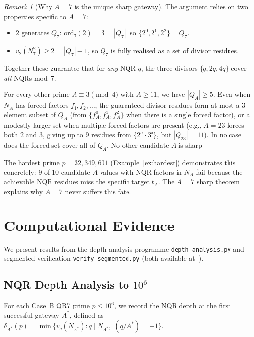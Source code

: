 \documentclass[12pt]{amsart}
\theoremstyle{definition}
\theoremstyle{remark}
\newtheorem{remark}[theorem]{Remark}
\begin{document}
\begin{remark}[Why $A = 7$ is the unique sharp gateway]\label{rem:a7unique}
The argument relies on two properties specific to $A = 7$:
\begin{itemize}
  \item $2$ generates $Q_7$: $\mathrm{ord}_7(2) = 3 = |Q_7|$,
    so $\{2^0, 2^1, 2^2\} = Q_7$.
  \item $v_2(N_7^2) \ge 2 = |Q_7| - 1$, so
    $Q_7$ is fully realised as a set of divisor residues.
\end{itemize}
Together these guarantee that for \emph{any} NQR $q$,
the three divisors $\{q, 2q, 4q\}$ cover \emph{all} NQRs mod~7.

For every other prime $A \equiv 3 \pmod 4$ with $A \ge 11$,
we have $|Q_A| \ge 5$.
Even when $N_A$ has forced factors $f_1, f_2, \ldots$,
the guaranteed divisor residues form at most a 3-element subset of $Q_A$
(from $\{f_A^0, f_A^1, f_A^2\}$ when there is a single forced factor),
or a modestly larger set when multiple forced factors are present
(e.g., $A = 23$ forces both $2$ and $3$, giving up to 9 residues from
$\{2^a \cdot 3^b\}$, but $|Q_{23}| = 11$).
In no case does the forced set cover all of $Q_A$.
No other candidate $A$ is sharp.

The hardest prime $p = 32{,}349{,}601$ (Example~\ref{ex:hardest})
demonstrates this concretely: 9 of 10 candidate $A$ values with
NQR factors in $N_A$ fail because the achievable NQR residues
miss the specific target $t_A$.
The $A = 7$ sharp theorem explains why $A = 7$ never suffers this fate.
\end{remark}

\section{Computational Evidence}\label{sec:computation}

We present results from the depth analysis programme
\texttt{depth\_analysis.py} and segmented verification
\texttt{verify\_segmented.py}
(both available at~\cite{Gateway2026}).

\subsection{NQR Depth Analysis to $10^6$}

For each Case~B QR7 prime $p \le 10^6$, we record the NQR depth
at the first successful gateway $A^*$, defined as
$\delta_{A^*}(p) = \min\{v_q(N_{A^*}) : q \mid N_{A^*},\; (q/A^*) = -1\}$.
\end{document}
